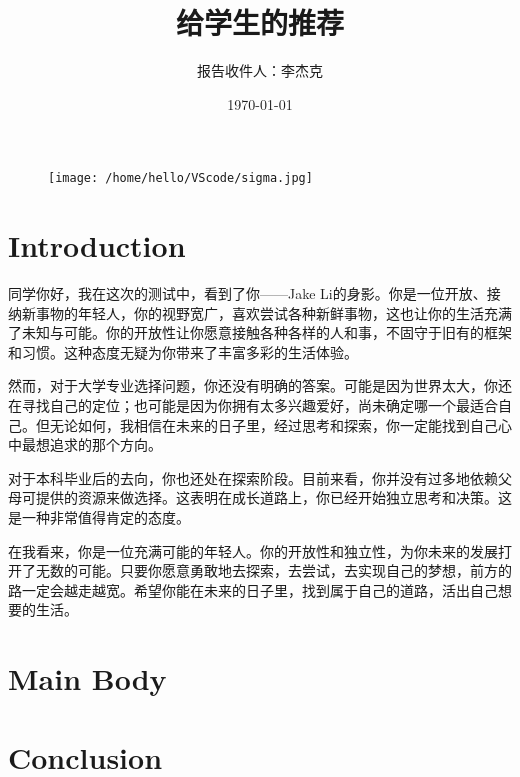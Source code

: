 \documentclass{article}
\begin{document}
\begin{CJK*}{UTF8}{gbsn}
\begin{figure}
\centering
\texttt{[image: /home/hello/VScode/sigma.jpg]}
\end{figure}
\title{给学生的推荐}
\author{报告收件人：李杰克}
\date{\today}
\section{Introduction}
同学你好，我在这次的测试中，看到了你——Jake Li的身影。你是一位开放、接纳新事物的年轻人，你的视野宽广，喜欢尝试各种新鲜事物，这也让你的生活充满了未知与可能。你的开放性让你愿意接触各种各样的人和事，不固守于旧有的框架和习惯。这种态度无疑为你带来了丰富多彩的生活体验。

然而，对于大学专业选择问题，你还没有明确的答案。可能是因为世界太大，你还在寻找自己的定位；也可能是因为你拥有太多兴趣爱好，尚未确定哪一个最适合自己。但无论如何，我相信在未来的日子里，经过思考和探索，你一定能找到自己心中最想追求的那个方向。

对于本科毕业后的去向，你也还处在探索阶段。目前来看，你并没有过多地依赖父母可提供的资源来做选择。这表明在成长道路上，你已经开始独立思考和决策。这是一种非常值得肯定的态度。

在我看来，你是一位充满可能的年轻人。你的开放性和独立性，为你未来的发展打开了无数的可能。只要你愿意勇敢地去探索，去尝试，去实现自己的梦想，前方的路一定会越走越宽。希望你能在未来的日子里，找到属于自己的道路，活出自己想要的生活。
\section{Main Body}


\section{Conclusion}


\printbibliography
\clearpage\end{CJK*}
\end{document}
